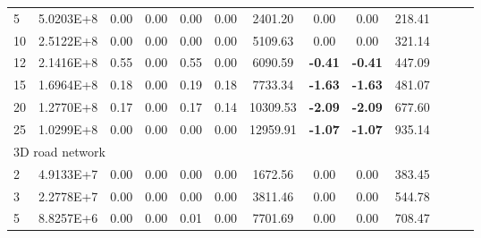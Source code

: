 {\begin{longtable}{@{}llccccccccccc@{}}
\multicolumn{1}{l|}{5}  & \multicolumn{1}{l|}{5.0203E+8}  & \multicolumn{1}{c|}{0.00}    & \multicolumn{1}{c|}{0.00} & \multicolumn{1}{c|}{0.00}   & 0.00 & \multicolumn{1}{c|}{2401.20}  & 0.00            & 0.00            & 218.41    \\
\multicolumn{1}{l|}{10} & \multicolumn{1}{l|}{2.5122E+8}  & \multicolumn{1}{c|}{0.00}    & \multicolumn{1}{c|}{0.00} & \multicolumn{1}{c|}{0.00}   & 0.00 & \multicolumn{1}{c|}{5109.63}  & 0.00            & 0.00            & 321.14    \\
\multicolumn{1}{l|}{12} & \multicolumn{1}{l|}{2.1416E+8}  & \multicolumn{1}{c|}{0.55}    & \multicolumn{1}{c|}{0.00} & \multicolumn{1}{c|}{0.55}   & 0.00 & \multicolumn{1}{c|}{6090.59}  & \textbf{-0.41}  & \textbf{-0.41}  & 447.09    \\
\multicolumn{1}{l|}{15} & \multicolumn{1}{l|}{1.6964E+8}  & \multicolumn{1}{c|}{0.18}    & \multicolumn{1}{c|}{0.00} & \multicolumn{1}{c|}{0.19}   & 0.18 & \multicolumn{1}{c|}{7733.34}  & \textbf{-1.63}  & \textbf{-1.63}  & 481.07    \\
\multicolumn{1}{l|}{20} & \multicolumn{1}{l|}{1.2770E+8}  & \multicolumn{1}{c|}{0.17}    & \multicolumn{1}{c|}{0.00} & \multicolumn{1}{c|}{0.17}   & 0.14 & \multicolumn{1}{c|}{10309.53} & \textbf{-2.09}  & \textbf{-2.09}  & 677.60    \\
\multicolumn{1}{l|}{25} & \multicolumn{1}{l|}{1.0299E+8}  & \multicolumn{1}{c|}{0.00}    & \multicolumn{1}{c|}{0.00} & \multicolumn{1}{c|}{0.00}   & 0.00 & \multicolumn{1}{c|}{12959.91} & \textbf{-1.07}  & \textbf{-1.07}  & 935.14    \\ \hline
\multicolumn{10}{l}{3D road network}                                                                                                                                                                                                      \\ \hline
\multicolumn{1}{l|}{2}  & \multicolumn{1}{l|}{4.9133E+7}  & \multicolumn{1}{c|}{0.00}    & \multicolumn{1}{c|}{0.00} & \multicolumn{1}{c|}{0.00}   & 0.00 & \multicolumn{1}{c|}{1672.56}  & 0.00            & 0.00            & 383.45    \\
\multicolumn{1}{l|}{3}  & \multicolumn{1}{l|}{2.2778E+7}  & \multicolumn{1}{c|}{0.00}    & \multicolumn{1}{c|}{0.00} & \multicolumn{1}{c|}{0.00}   & 0.00 & \multicolumn{1}{c|}{3811.46}  & 0.00            & 0.00            & 544.78    \\
\multicolumn{1}{l|}{5}  & \multicolumn{1}{l|}{8.8257E+6}  & \multicolumn{1}{c|}{0.00}    & \multicolumn{1}{c|}{0.00} & \multicolumn{1}{c|}{0.01}   & 0.00 & \multicolumn{1}{c|}{7701.69}  & 0.00            & 0.00            & 708.47    \\

\end{longtable}}
